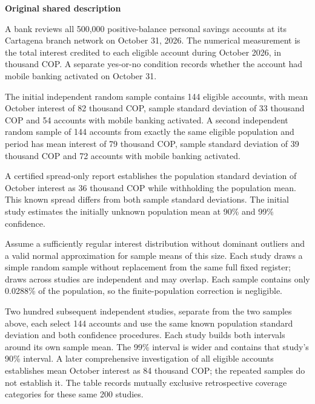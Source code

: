 \clearpage


\textbf{Original shared description}

A bank reviews all 500,000 positive-balance personal savings accounts at its Cartagena branch network on October 31, 2026. The numerical measurement is the total interest credited to each eligible account during October 2026, in thousand COP. A separate yes-or-no condition records whether the account had mobile banking activated on October 31.

The initial independent random sample contains 144 eligible accounts, with mean October interest of 82 thousand COP, sample standard deviation of 33 thousand COP and 54 accounts with mobile banking activated. A second independent random sample of 144 accounts from exactly the same eligible population and period has mean interest of 79 thousand COP, sample standard deviation of 39 thousand COP and 72 accounts with mobile banking activated.

A certified spread-only report establishes the population standard deviation of October interest as 36 thousand COP while withholding the population mean. This known spread differs from both sample standard deviations. The initial study estimates the initially unknown population mean at 90\% and 99\% confidence.

Assume a sufficiently regular interest distribution without dominant outliers and a valid normal approximation for sample means of this size. Each study draws a simple random sample without replacement from the same full fixed register; draws across studies are independent and may overlap. Each sample contains only 0.0288\% of the population, so the finite-population correction is negligible.

Two hundred subsequent independent studies, separate from the two samples above, each select 144 accounts and use the same known population standard deviation and both confidence procedures. Each study builds both intervals around its own sample mean. The 99\% interval is wider and contains that study's 90\% interval. A later comprehensive investigation of all eligible accounts establishes mean October interest as 84 thousand COP; the repeated samples do not establish it. The table records mutually exclusive retrospective coverage categories for these same 200 studies.


